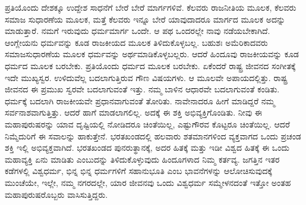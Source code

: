 ಪ್ರತಿಯೊಂದು ದೇಶಕ್ಕೂ ಉದ್ದೇಶ ಸಾಧನೆಗೆ ಬೇರೆ ಬೇರೆ ಮಾರ್ಗಗಳಿವೆ. ಕೆಲವರು ರಾಜನೀತಿಯ ಮೂಲಕ, ಕೆಲವರು ಸಮಾಜ ಸುಧಾರಣೆಯ ಮೂಲಕ, ಮತ್ತೆ ಕೆಲವರು ಇನ್ನೂ ಬೇರೆ ಯಾವುದಾದರೂ ಮಾರ್ಗದ ಮೂಲಕ ಅದನ್ನು ಮಾಡುತ್ತಾರೆ. ನಮಗೆ ಇರುವುದು ಧರ್ಮಮಾರ್ಗ ಒಂದೇ. ಆ ಪಥ ಒಂದರಲ್ಲೇ ನಾವು ನಡೆಯಬೇಕಾಗಿದೆ. ಆಂಗ್ಲೇಯನು ಧರ್ಮವನ್ನು ಕೂಡ ರಾಜಕೀಯದ ಮೂಲಕ ತಿಳಿದುಕೊಳ್ಳಬಲ್ಲ. ಬಹುಶಃ ಅಮೆರಿಕಾದವರು ಸಮಾಜಸುಧಾರಣೆಯ ಮೂಲಕ ಧರ್ಮವನ್ನು ಅರ್ಥಮಾಡಿಕೊಳ್ಳಬಲ್ಲರು. ಆದರೆ ಹಿಂದೂವು ರಾಜಕೀಯವನ್ನು ಕೂಡ ಧರ್ಮದ ಮೂಲಕ ಬರಬೇಕು. ಪ್ರತಿಯೊಂದು ಧರ್ಮದ ಮೂಲಕ ಬರಬೇಕು. ಏಕೆಂದರೆ ರಾಷ್ಟ್ರ ಜೀವನದ ಸಂಗೀತಕ್ಕೆ ಇದೇ ಮುಖ್ಯಸ್ವರ. ಉಳಿದುವೆಲ್ಲ ಬದಲಾಗುತ್ತಿರುವ ಗೌಣ ವಿಷಯಗಳು. ಆ ಮೂಲವೇ ಅಪಾಯದಲ್ಲಿತ್ತು. ರಾಷ್ಟ್ರ ಜೀವನದ ಈ ಪ್ರಮುಖ ಸ್ವರವೇ ಬದಲಾಗುವಂತೆ ಇತ್ತು. ನಮ್ಮ ಬಾಳಿನ ಆಧಾರವೇ ಬದಲಾಗುವಂತೆ ಕಂಡಿತು. ಧರ್ಮಕ್ಕೆ ಬದಲಾಗಿ ರಾಜಕೀಯವೇ ಪ್ರಧಾನವಾಗುವಂತೆ ತೋರಿತು. ನಾವೇನಾದರೂ ಹೀಗೆ ಮಾಡಿದ್ದರೆ ನಮ್ಮ ಸರ್ವನಾಶವಾಗುತ್ತಿತ್ತು. ಆದರೆ ಹಾಗೆ ಮಾಡಲಾಗಲಿಲ್ಲ. ಅದಕ್ಕೆ ಈ ಶಕ್ತಿ ಅಭಿವ್ಯಕ್ತಿಗೊಂಡಿತು. ನೀವು ಈ ಮಹಾಪುರುಷರನ್ನು ಯಾವ ದೃಷ್ಟಿಯಲ್ಲಿ ನೋಡಿದರೂ ಚಿಂತೆಯಿಲ್ಲ, ಎಷ್ಟುಗೌರವ ಕೊಟ್ಟರೂ ಚಿಂತೆಯಿಲ್ಲ. ಆದರೆ ನಿಮ್ಮೆದುರಿಗೆ ಈ ಸವಾಲನ್ನು ಹಾಕುತ್ತೇನೆ. ಭರತಖಂಡದಲ್ಲಿ ಹಲವಾರು ಶತಮಾನಗಳಿಂದ ವ್ಯಕ್ತವಾಗದ ಒಂದು ಪ್ರಚಂಡ ಶಕ್ತಿ ಇಲ್ಲಿ ಅಭಿವ್ಯಕ್ತವಾಗಿದೆ. ಭರತಖಂಡದ ಪುನರುತ್ಥಾನಕ್ಕೆ, ಅದರ ಹಿತಕ್ಕೆ ಮತ್ತು ಇಡೀ ವಿಶ್ವದ ಹಿತಕ್ಕೆ ಈ ಒಂದು ಮಹಾವ್ಯಕ್ತಿ ಏನು ಮಾಡಿತು ಎಂಬುದನ್ನು ತಿಳಿದುಕೊಳ್ಳುವುದು ಹಿಂದೂಗಳಾದ ನಿಮ್ಮ ಕರ್ತವ್ಯ. ಜಗತ್ತಿನ ಇತರ ಕಡೆಗಳಲ್ಲಿ ವಿಶ್ವಧರ್ಮ, ಭಿನ್ನ ಭಿನ್ನ ಧರ್ಮಗಳಿಗೆ ಸಹಾನುಭೂತಿ ಎಂಬ ಭಾವನೆಗಳನ್ನು ಆಲೋಚಿಸುವುದಕ್ಕೆ ಮುಂಚೆಯೇ, ಇಲ್ಲೇ, ನಮ್ಮ ನಗರದಲ್ಲೇ, ಯಾರ ಜೀವನವು ಒಂದು ವಿಶ್ವಧರ್ಮ ಸಮ್ಮೇಳನದಂತೆ ಇತ್ತೋ ಅಂತಹ ಮಹಾಪುರುಷರೊಬ್ಬರು ವಾಸಿಸುತ್ತಿದ್ದರು. 

